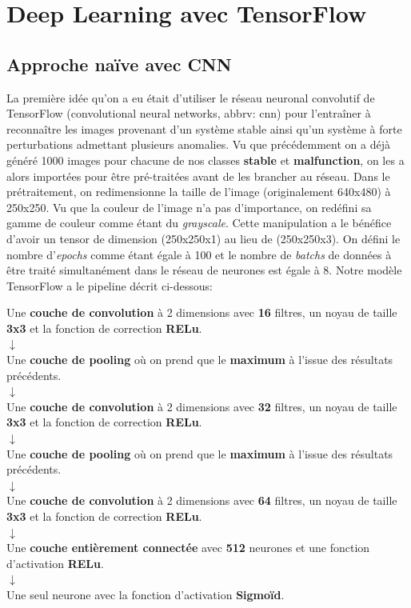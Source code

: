 \documentclass[french]{article}
\theoremstyle{mytheoremstyle}
\theoremstyle{mytheoremstyle}
\theoremstyle{myproblemstyle}
\begin{document}
    \section{Deep Learning avec TensorFlow}
        \subsection{Approche naïve avec CNN}
        La première idée qu'on a eu était d'utiliser le réseau neuronal convolutif de TensorFlow (convolutional neural networks, abbrv: cnn) pour l'entraîner à reconnaître les images provenant d'un système stable ainsi qu'un système à forte perturbations admettant plusieurs anomalies. Vu que précédemment on a déjà généré 1000 images pour chacune de nos classes \textbf{stable} et \textbf{malfunction}, on les a alors importées pour être pré-traitées avant de les brancher au réseau. Dans le prétraitement, on redimensionne la taille de l'image (originalement 640x480) à 250x250. Vu que la couleur de l'image n'a pas d'importance, on redéfini sa gamme de couleur comme étant du \textit{grayscale}. Cette manipulation a le bénéfice d'avoir un tensor de dimension (250x250x1) au lieu de (250x250x3). On défini le nombre d'\textit{epochs} comme étant égale à 100 et le nombre de \textit{batchs} de données à être traité simultanément dans le réseau de neurones est égale à 8. Notre modèle TensorFlow a le pipeline décrit ci-dessous:
        \begin{center}
            Une \textbf{couche de convolution} à 2 dimensions avec \textbf{16} filtres, un noyau de taille \textbf{3x3} et la fonction de correction \textbf{RELu}. \\
            $
            \downarrow
            $\\
            Une \textbf{couche de pooling} où on prend que le \textbf{maximum} à l'issue des résultats précédents. \\
            $
            \downarrow
            $\\
            Une \textbf{couche de convolution} à 2 dimensions avec \textbf{32} filtres, un noyau de taille \textbf{3x3} et la fonction de correction \textbf{RELu}. \\
            $
            \downarrow
            $\\
            Une \textbf{couche de pooling} où on prend que le \textbf{maximum} à l'issue des résultats précédents. \\
            $
            \downarrow
            $\\
            Une \textbf{couche de convolution} à 2 dimensions avec \textbf{64} filtres, un noyau de taille \textbf{3x3} et la fonction de correction \textbf{RELu}.\\
            $
            \downarrow
            $\\
            Une \textbf{couche entièrement connectée} avec \textbf{512} neurones et une fonction d'activation \textbf{RELu}.\\
            $
            \downarrow
            $\\
            Une seul neurone avec la fonction d'activation \textbf{Sigmoïd}.
        \end{center}
\end{document}
